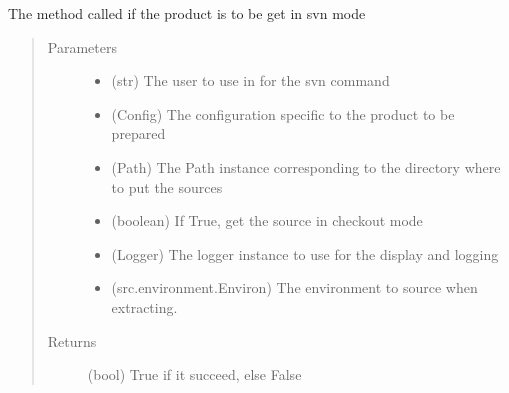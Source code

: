 \documentclass[a4paper,10pt,english]{sphinxmanual}
\begin{document}

\begin{fulllineitems}
\label{\detokenize{apidoc_commands/commands:commands.source.get_source_from_svn}}
The method called if the product is to be get in svn mode
\begin{quote}\begin{description}
\item[{Parameters}] \leavevmode\begin{itemize}
\item {} 
 \textendash{} (str) The user to use in for the svn command

\item {} 
 \textendash{} (Config)
The configuration specific to the product to be prepared

\item {} 
 \textendash{} (Path)
The Path instance corresponding to the directory 
where to put the sources

\item {} 
 \textendash{} (boolean) 
If True, get the source in checkout mode

\item {} 
 \textendash{} (Logger)
The logger instance to use for the display and logging

\item {} 
 \textendash{} (src.environment.Environ)
The environment to source when extracting.

\end{itemize}

\item[{Returns}] \leavevmode
(bool) True if it succeed, else False

\end{description}\end{quote}

\end{fulllineitems}
\end{document}
